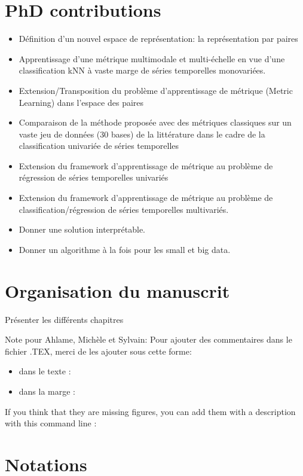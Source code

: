 \section*{PhD contributions}
\begin{itemize}
	\item Définition d’un nouvel espace de représentation: la représentation par paires
	\item Apprentissage d’une métrique multimodale et multi-échelle en vue d’une classification kNN à vaste marge de séries temporelles monovariées.
	\item Extension/Transposition du problème d’apprentissage de métrique (Metric Learning) dans l’espace des paires
	\item Comparaison de la méthode proposée avec des métriques classiques sur un vaste jeu de données (30 bases) de la littérature dans le cadre de la classification univariée de séries temporelles
	\item Extension du framework d’apprentissage de métrique au problème de régression de séries temporelles univariés
	\item Extension du framework d’apprentissage de métrique au problème de classification/régression de séries temporelles multivariés. 
	\item Donner une solution interprétable.
	\item Donner un algorithme à la fois pour les small et big data.
\end{itemize}

\section*{Organisation du manuscrit}
Présenter les différents chapitres

Note pour Ahlame, Michèle et Sylvain: Pour ajouter des commentaires dans le fichier .TEX, merci de les ajouter sous cette forme:
\begin{itemize}
	\item dans le texte : 
	\item dans la marge : 
\end{itemize}
If you think that they are missing figures, you can add them with a description with this command line :


\newpage
\section*{Notations}

